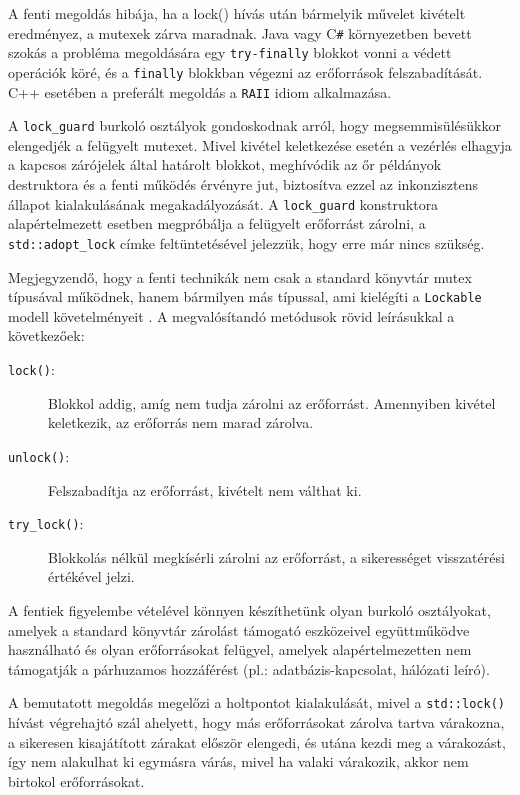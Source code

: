 %    
    A fenti megoldás hibája, ha a {lock()} hívás után bármelyik művelet kivételt eredményez, a mutexek zárva maradnak. Java vagy C\texttt{\#} környezetben bevett szokás a probléma megoldására egy \texttt{try-finally} blokkot vonni a védett operációk köré, és a \texttt{finally} blokkban végezni az erőforrások felszabadítását. C++ esetében a preferált megoldás a \texttt{RAII} idiom \cite{ExceptionalC++} alkalmazása.
    
%    
    A \texttt{lock\_guard} burkoló osztályok gondoskodnak arról, hogy megsemmisülésükkor elengedjék a felügyelt mutexet. Mivel kivétel keletkezése esetén a vezérlés elhagyja a kapcsos zárójelek által határolt blokkot, meghívódik az őr példányok destruktora és a fenti működés érvényre jut, biztosítva ezzel az inkonzisztens állapot kialakulásának megakadályozását. A \texttt{lock\_guard} konstruktora alapértelmezett esetben megpróbálja a felügyelt erőforrást zárolni, a \texttt{std::adopt\_lock} címke feltüntetésével jelezzük, hogy erre már nincs szükség.
    
    Megjegyzendő, hogy a fenti technikák nem csak a standard könyvtár mutex típusával működnek, hanem bármilyen más típussal, ami kielégíti a \texttt{Lockable} modell követelményeit \cite{C++11/Lockable}. A megvalósítandó metódusok rövid leírásukkal a következőek:
    
\begin{description}
    \item[\texttt{lock()}:] Blokkol addig, amíg nem tudja zárolni az erőforrást. Amennyiben kivétel keletkezik, az erőforrás nem marad zárolva.
    \item[\texttt{unlock()}:] Felszabadítja az erőforrást, kivételt nem válthat ki.
    \item[\texttt{try\_lock()}:] Blokkolás nélkül megkísérli zárolni az erőforrást, a sikerességet visszatérési értékével jelzi.
\end{description}
%
    A fentiek figyelembe vételével könnyen készíthetünk olyan burkoló osztályokat, amelyek a standard könyvtár zárolást támogató eszközeivel együttműködve használható és olyan erőforrásokat felügyel, amelyek alapértelmezetten nem támogatják a párhuzamos hozzáférést (pl.: adatbázis-kapcsolat, hálózati leíró).
    
    A bemutatott megoldás megelőzi a holtpontot kialakulását, mivel a \texttt{std::lock()} hívást végrehajtó szál ahelyett, hogy más erőforrásokat zárolva tartva várakozna, a sikeresen kisajátított zárakat először elengedi, és utána kezdi meg a várakozást, így nem alakulhat ki egymásra várás, mivel ha valaki várakozik, akkor nem birtokol erőforrásokat.
    
